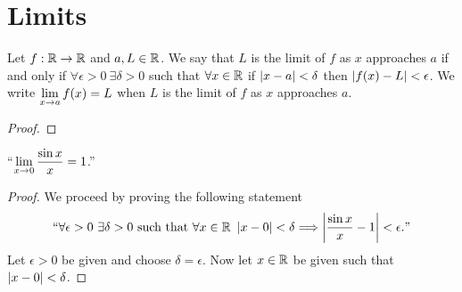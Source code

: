     \section{Limits}
        \begin{definition}
            Let $f: \mathbb{R} \rightarrow \mathbb{R}$ and $a, L \in \mathbb{R}$. We say that
            $L$ is the limit of $f$ as $x$ approaches $a$ if and only if
            $\forall \epsilon > 0 \ \exists \delta > 0$ such that $\forall x \in \mathbb{R}$
            if $\left|x - a\right| < \delta$ then $\left|f(x) - L\right| < \epsilon$.
            We write $\displaystyle\lim_{x \to a} f(x) = L$ when $L$ is the limit of $f$ as $x$ approaches $a$.
        \end{definition}
        \begin{theorem}
        \end{theorem}
        \begin{proof}
        \end{proof}
        \begin{theorem}
            ``$\displaystyle\lim_{x \to 0} \frac{\sin x}{x} = 1$.''
        \end{theorem}
        \begin{proof}
            We proceed by proving the following statement
            \[
                ``\forall \epsilon > 0 \ \exists \delta > 0 \mbox{ such that } \forall x \in \mathbb{R} \
                \left|x - 0\right| < \delta \Longrightarrow \left|\frac{\sin x}{x} - 1\right| < \epsilon."
            \]
            Let $\epsilon > 0$ be given and choose $\delta = \epsilon$. Now let $x \in \mathbb{R}$
            be given such that $\left|x - 0\right| < \delta$.
        \end{proof}

